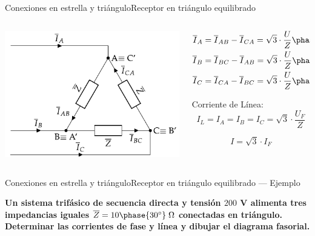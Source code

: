 \documentclass[aspectratio=169, xcolor={usenames,svgnames,dvipsnames}]{beamer}
\begin{document}
\begin{frame}{Conexiones en estrella y triángulo}{Receptor en triángulo equilibrado}
\begin{columns}
\begin{column}{0.5\columnwidth}
\begin{center}
\includegraphics[width=.9\linewidth]{../figs/TrianguloEquilibrado_Receptor.pdf}
\end{center}
\end{column}

\begin{column}{0.5\columnwidth}
\begin{align*}
  \overline{I}_A &= \overline{I}_{AB} - \overline{I}_{CA} = \sqrt{3} \cdot \frac{U}{Z}\phase{\ang{\pm 90} - \theta}\\
  \overline{I}_B &= \overline{I}_{BC} - \overline{I}_{AB} = \sqrt{3} \cdot \frac{U}{Z}\phase{\ang{\mp 30} - \theta}\\
  \overline{I}_C &= \overline{I}_{CA} - \overline{I}_{BC} = \sqrt{3} \cdot \frac{U}{Z}\phase{\ang{\mp 150} - \theta}\\
\end{align*}

Corriente de Línea:
\[
  \boxed{I_L = {I}_A = {I}_B = {I}_C = \sqrt{3} \cdot \frac{U_F}{Z}}
\]

\[
  \boxed{I = \sqrt{3} \cdot I_F}
\]
\end{column}
\end{columns}
\end{frame}

\begin{frame}{Conexiones en estrella y triángulo}{Receptor en triángulo equilibrado --- Ejemplo}

\textbf{Un sistema trifásico de secuencia directa y tensión $200$ V alimenta tres impedancias iguales $\overline{Z}=10\phase{30^\circ}\;\Omega$ conectadas en triángulo. Determinar las corrientes de fase y línea y dibujar el diagrama fasorial.}
    
\end{frame}
\end{document}
